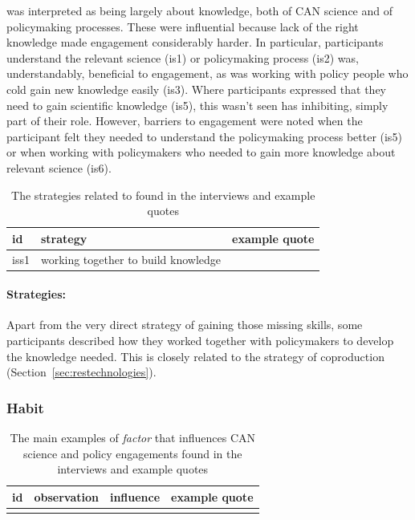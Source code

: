\ismis{} was interpreted as being largely about knowledge, both of CAN science and of policymaking processes. These were influential because lack of the right knowledge made engagement considerably harder. In particular, participants understand the relevant science (is1) or policymaking process (is2) was, understandably, beneficial to engagement, as was working with policy people who cold gain new knowledge easily (is3). Where participants expressed that they need to gain scientific knowledge (is5), this wasn't seen has inhibiting, simply part of their role. However, barriers to engagement were noted when the participant felt they needed to understand the policymaking process better (is5) or when working with policymakers who needed to gain more knowledge about relevant science (is6). 

\begin{table}[!ht]
\footnotesize
\caption{The strategies related to \ismis{} found in the interviews and example quotes}\label{tab:resskillsstrat}
\begin{tabular}{L{.06\linewidth}L{.3\linewidth}L{.64\linewidth}} \hline
\textbf{id} & \textbf{strategy} & \textbf{example quote} \\ \hline \hline
iss1 & working together to build knowledge &  \\[5mm] \hline
 \end{tabular}
\end{table}

\paragraph{Strategies:}
Apart from the very direct strategy of gaining those missing skills, some participants described how they worked together with policymakers to develop the knowledge needed. This is closely related to the strategy of coproduction (Section~\ref{sec:restechnologies}).

\subsubsection{Habit}\label{sec:resismhabit}

\begin{table}[!ht]
\footnotesize
\caption{The main examples of \emph{factor} that influences CAN science and policy  engagements found in the interviews and example quotes}\label{tab:res****}
\begin{tabular}{L{.06\linewidth}L{.3\linewidth}L{.12\linewidth}L{.52\linewidth}} \hline
\textbf{id} & \textbf{observation} & \textbf{influence} & \textbf{example quote} \\ \hline \hline 
 &  &  &  \\[5mm] \hline
\end{tabular}
\end{table}

